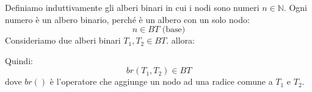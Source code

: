 \documentclass[a4paper]{article}
\begin{document}
\begin{Example}{}{}
Definiamo induttivamente gli alberi binari in cui i nodi sono 
numeri $n \in \mathbb{N}$. Ogni numero è un albero binario, perché
è un albero con un solo nodo:
\[
    n \in BT \text{ (base)}
\]
Consideriamo due alberi binari $T_1, T_2 \in BT$. allora:
\begin{figure}[H]
    \centering 
\end{figure}
Quindi:
\[
    br(T_1, T_2) \in BT
\]
dove $br()$ è l'operatore che aggiunge un nodo ad una radice comune a $T_1$ e $T_2$.\\
\tcblower


\end{Example}
\end{document}
